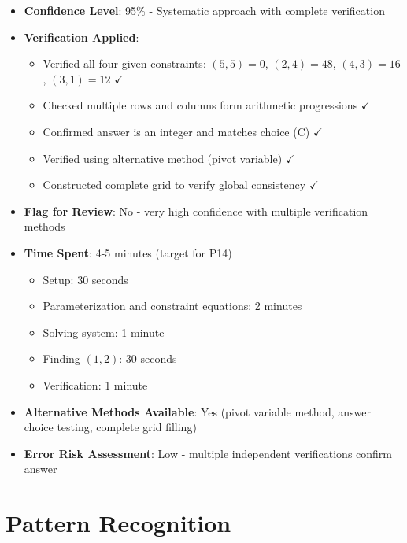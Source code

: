 \documentclass[12pt]{article}
\begin{document}
\begin{itemize}[leftmargin=*]
    \item \textbf{Confidence Level}: 95\% - Systematic approach with complete verification
    
    \item \textbf{Verification Applied}: 
    \begin{itemize}
        \item Verified all four given constraints: $(5,5) = 0$, $(2,4) = 48$, $(4,3) = 16$, $(3,1) = 12$ $\checkmark$
        \item Checked multiple rows and columns form arithmetic progressions $\checkmark$
        \item Confirmed answer is an integer and matches choice (C) $\checkmark$
        \item Verified using alternative method (pivot variable) $\checkmark$
        \item Constructed complete grid to verify global consistency $\checkmark$
    \end{itemize}
    
    \item \textbf{Flag for Review}: No - very high confidence with multiple verification methods
    
    \item \textbf{Time Spent}: 4-5 minutes (target for P14)
    \begin{itemize}
        \item Setup: 30 seconds
        \item Parameterization and constraint equations: 2 minutes
        \item Solving system: 1 minute
        \item Finding $(1,2)$: 30 seconds
        \item Verification: 1 minute
    \end{itemize}
    
    \item \textbf{Alternative Methods Available}: Yes (pivot variable method, answer choice testing, complete grid filling)
    
    \item \textbf{Error Risk Assessment}: Low - multiple independent verifications confirm answer
\end{itemize}

\section*{Pattern Recognition}
\end{document}

